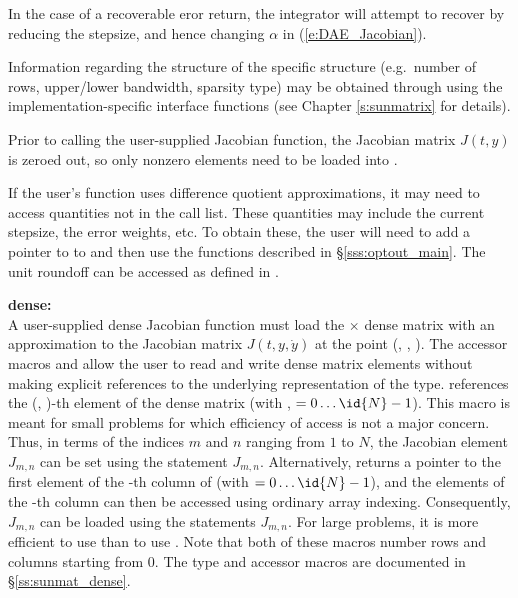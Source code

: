 {{  In the case of a recoverable eror return,
  the integrator will attempt to recover by reducing the stepsize,
  and hence changing $\alpha$ in (\ref{e:DAE_Jacobian}).
}
{
  Information regarding the structure of the specific {\sunmatrix}
  structure (e.g.~number of rows, upper/lower bandwidth, sparsity
  type) may be obtained through using the implementation-specific
  {\sunmatrix} interface functions (see Chapter \ref{s:sunmatrix} for
  details).

  Prior to calling the user-supplied Jacobian function, the Jacobian
  matrix $J(t,y)$ is zeroed out, so only nonzero elements need to be
  loaded into .

  If the user's  function uses difference
  quotient approximations, it may need to access quantities not in the
  call list. These quantities may include the current stepsize, the error weights, etc.
  To obtain these, the user will need to add a pointer to 
  to  and then use the  functions described in
  \S\ref{sss:optout_main}. The unit roundoff can be accessed as
   defined in .

  {\bf dense:}\\
  A user-supplied dense Jacobian function must load the  $\times$ 
  dense matrix  with an approximation to the Jacobian matrix $J(t,y,\dot{y})$
  at the point (, , ).  The accessor macros 
  and  allow the user to read and write dense matrix
  elements without making explicit references to the underlying
  representation of the {\sunmatdense} type.
   references the (, )-th
  element of the dense matrix  (with , $= 0\ldots
  \id{N}-1$). This macro is meant for small problems for which efficiency
  of access is not a major concern.  Thus, in terms of the indices $m$
  and $n$ ranging from $1$ to $N$, the Jacobian element $J_{m,n}$ can
  be set using the statement 
  $J_{m,n}$.  Alternatively,  returns a
  pointer to the first element of the -th column of 
  (with $= 0\ldots \id{N}-1$), and the elements of the -th column
  can then be accessed using ordinary array indexing.  Consequently,
  $J_{m,n}$ can be loaded using the statements
    $J_{m,n}$.
  For large problems, it is more efficient to use 
  than to use .  Note that both of these macros
  number rows and columns starting from $0$.  The {\sunmatdense} type
  and accessor macros are documented in \S\ref{ss:sunmat_dense}.

}}
